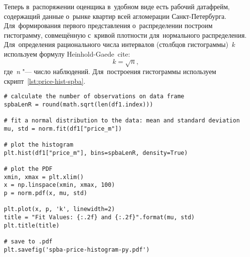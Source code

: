 \documentclass[]{scrreprt}
\begin{document}
Теперь в~распоряжении оценщика в~удобном виде есть рабочий датафрейм, содержащий данные о~рынке квартир всей агломерации Санкт-Петербурга. Для~формирования первого представления о~распределении построим гистограмму, совмещённую с~кривой плотности для~нормального распределения. Для~определения рационального числа интервалов (столбцов гистограммы)~$k$ используем формулу Heinhold-Gaede~cite\cite{Ingenieur-Statistik}:
\begin{equation}\label{eq:k-hist-Heinhold-Gaede}
k = \sqrt{n},
\end{equation}
где~\textit{n} "--- число наблюдений. Для~построения гистограммы используем скрипт~\ref{lst:price-hist-spba}.
%
\begin{lstlisting}[float, caption = Построение гистограммы для~агломерации Санкт-Петербурга, firstnumber=1, label= lst:price-hist-spba]
# calculate the number of observations on data frame
spbaLenR = round(math.sqrt(len(df1.index)))

# fit a normal distribution to the data: mean and standard deviation
mu, std = norm.fit(df1["price_m"])

# plot the histogram
plt.hist(df1["price_m"], bins=spbaLenR, density=True)

# plot the PDF
xmin, xmax = plt.xlim()
x = np.linspace(xmin, xmax, 100)
p = norm.pdf(x, mu, std)

plt.plot(x, p, 'k', linewidth=2)
title = "Fit Values: {:.2f} and {:.2f}".format(mu, std)
plt.title(title)

# save to .pdf
plt.savefig('spba-price-histogram-py.pdf')
\end{lstlisting}
%
\end{document}
